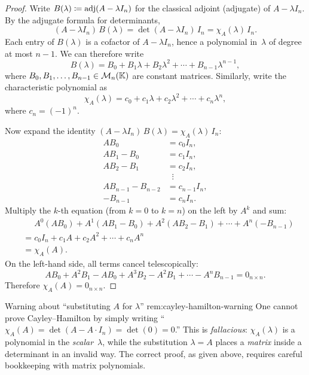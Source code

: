 \begin{proof}
Write $B(\lambda) \coloneqq \operatorname{adj}(A - \lambda I_n)$ for the
classical adjoint (adjugate) of $A - \lambda I_n$.  By the adjugate
formula for determinants,
\[
  (A - \lambda I_n)\, B(\lambda) = \det(A - \lambda I_n)\, I_n
  = \chi_A(\lambda)\, I_n.
\]
Each entry of $B(\lambda)$ is a cofactor of $A - \lambda I_n$, hence a
polynomial in~$\lambda$ of degree at most $n-1$.  We can therefore
write
\[
  B(\lambda) = B_0 + B_1\lambda + B_2\lambda^2 + \cdots
    + B_{n-1}\lambda^{n-1},
\]
where $B_0,B_1,\ldots,B_{n-1}\in\mathcal{M}_n({\mathbb{K}})$ are constant matrices.
Similarly, write the characteristic polynomial as
\[
  \chi_A(\lambda) = c_0 + c_1\lambda + c_2\lambda^2 + \cdots
    + c_n\lambda^n,
\]
where $c_n = (-1)^n$.

Now expand the identity $(A - \lambda I_n)\,B(\lambda) = \chi_A(\lambda)\,I_n$:
\begin{align*}
  A B_0 &= c_0 I_n, \\
  A B_1 - B_0 &= c_1 I_n, \\
  A B_2 - B_1 &= c_2 I_n, \\
  &\;\;\vdots \\
  A B_{n-1} - B_{n-2} &= c_{n-1} I_n, \\
  -B_{n-1} &= c_n I_n.
\end{align*}
Multiply the $k$-th equation (from $k=0$ to $k=n$) on the left by
$A^k$ and sum:
\begin{align*}
  &\phantom{{}={}} A^0(AB_0) + A^1(AB_1 - B_0) + A^2(AB_2 - B_1)
    + \cdots + A^n(-B_{n-1}) \\
  &= c_0 I_n + c_1 A + c_2 A^2 + \cdots + c_n A^n \\
  &= \chi_A(A).
\end{align*}
On the left-hand side, all terms cancel telescopically:
\[
  AB_0 + A^2 B_1 - AB_0 + A^3 B_2 - A^2 B_1 + \cdots - A^n B_{n-1}
  = 0_{n\times n}.
\]
Therefore $\chi_A(A) = 0_{n\times n}$.
\end{proof}

\begin{remark}{Warning about ``substituting $A$ for $\lambda$''}%
{rem:cayley-hamilton-warning}
One cannot prove Cayley--Hamilton by simply writing
``$\chi_A(A) = \det(A - A\cdot I_n) = \det(0) = 0$.''
This is \emph{fallacious}: $\chi_A(\lambda)$ is a polynomial
in the \emph{scalar}~$\lambda$, while the substitution $\lambda = A$
places a \emph{matrix} inside a determinant in an invalid way.  The
correct proof, as given above, requires careful bookkeeping with matrix
polynomials.
\end{remark}

